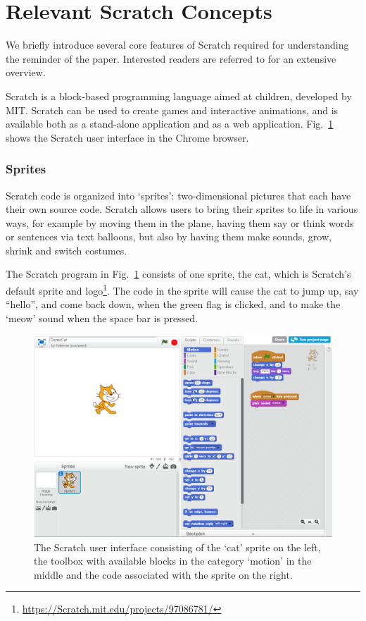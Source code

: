 \documentclass[conference]{IEEEtran}
\begin{document}
\section{Relevant Scratch Concepts}
\label{sec:Scratch}
We briefly introduce several core features of Scratch required for understanding the reminder of the paper. 
Interested readers are referred to \cite{brennan_creative_2014} for an extensive overview.  

Scratch is a block-based programming language aimed at children, developed by MIT. Scratch can be used to create games and interactive animations, and is available both as a stand-alone application and as a web application. Fig.~\ref{fig:ui} shows the Scratch user interface in the Chrome browser.

\subsubsection{Sprites}
Scratch code is organized into `sprites': two-dimensional pictures that each have their own source code. Scratch allows users to bring their sprites to life in various ways, for example by moving them in the plane, having them say or think words or sentences via text balloons, but also by having them make sounds, grow, shrink and switch costumes. 

The Scratch program in Fig.~\ref{fig:ui} consists of one sprite, the cat, which is Scratch's default sprite and logo\footnote{\url{https://Scratch.mit.edu/projects/97086781/}}. The code in the sprite will cause the cat to jump up, say ``hello'', and come back down, when the green flag is clicked, and to make the `meow' sound when the space bar is pressed.

\begin{figure}
  \begin{center}
  \includegraphics[width=\columnwidth]{fig/ui.png}
  \caption{The Scratch user interface consisting of the `cat' sprite on the left, the toolbox with available blocks in the category `motion' in the middle and the code associated with the sprite on the right.}
  \label{fig:ui}
  \end{center}
\end{figure} 
\end{document}
